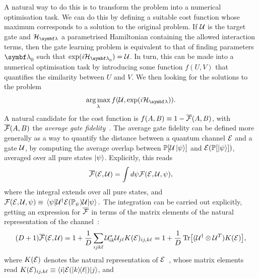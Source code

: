 A natural way to do this is to transform the problem into a numerical optimisation task. We can do this by defining a suitable cost function whose maximum corresponds to a solution to the original problem.
If ${\mathcal{U}}$ is the target gate and $\calH_\bslambda$ a parametrised Hamiltonian containing the allowed interaction terms, then the gate learning problem is equivalent to that of finding parameters $\bslambda_0$ such that $\exponential(i\calH_{\bslambda_0})=\calU$.
In turn, this can be made into a numerical optimisation task by introducing some function $f(U, V)$ that quantifies the similarity between $U$ and $V$. We then looking for the solutions to the problem
\begin{equation}
    \argmax_\lambda f(\calU, \exponential(i\calH_{\bslambda})).
    \label{eq:GL:gatelearning_as_optimisation}
\end{equation}
A natural candidate for the cost function is $f(A,B)\equiv 1-\overline{{\mathcal{F}}}(A,B)$, with $\overline{{\mathcal{F}}}(A,B)$ the \textit{average gate fidelity}~\cite{nielsen2002simple,magesan2011gate}. The average gate fidelity can be defined more generally as a way to quantify the distance between a quantum channel ${\mathcal{E}}$ and a gate ${\mathcal{U}}$, by computing the average overlap between ${\mathbb{P}}[{\mathcal{U}}\ket\psi]$ and ${\mathcal{E}}({\mathbb{P}}[\ket\psi])$, averaged over all pure states $\ket\psi$. Explicitly, this reads
\begin{equation}
    \overline{{\mathcal{F}}}({\mathcal{E}},{\mathcal{U}}) = \int d\psi {\mathcal{F}}({\mathcal{E}}, {\mathcal{U}}, \psi),
\end{equation}
where the integral extends over all pure states, and
$
    {\mathcal{F}}({\mathcal{E}}, {\mathcal{U}}, \psi) \equiv
    \mel*{\psi}{{\mathcal{U}}^\dagger {\mathcal{E}}({\mathbb{P}}_\psi){\mathcal{U}}}{\psi}.
$
The integration can be carried out explicitly, getting an expression for $\overline{{\mathcal{F}}}$ in terms of the matrix elements of the natural representation of the channel~\cite{pedersen2007fidelity,banchi2011nonperturbative,magesan2011gate,banchi2016quantum}:
\begin{equation}
    (D+1) \overline{{\mathcal{F}}}({\mathcal{E}},{\mathcal{U}}) =
    1 + \frac{1}{D}\sum_{ijk\ell}{\mathcal{U}}^*_{ik} {\mathcal{U}}_{j\ell}K({\mathcal{E}})_{ij,k\ell}
    = 1 + \frac{1}{D}\Tr[({\mathcal{U}}^\dagger\otimes {\mathcal{U}}^T)K({\mathcal{E}})],
    \label{eq:GL:explicit_fidelity_map_unitary}
\end{equation}
where $K({\mathcal{E}})$ denotes the natural representation of ${\mathcal{E}}$~\cite{watrous2018theory}, whose matrix elements read
$K({\mathcal{E}})_{ij,k\ell}\equiv\langle i|{\mathcal{E}}(\ketbra{k}{\ell})|j\rangle$, and
